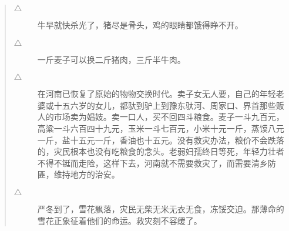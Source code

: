 \begin{quote}
\begin{description}
		\item [$\bigtriangleup$] 牛早就快杀光了，猪尽是骨头，鸡的眼睛都饿得睁不开。\\

		\item [$\bigtriangleup$] 一斤麦子可以换二斤猪肉，三斤半牛肉。\\

		\item [$\bigtriangleup$] 在河南已恢复了原始的物物交换时代。卖子女无人要，自己的年轻老婆或十五六岁的女儿，都驮到驴上到豫东驮河、周家口、界首那些贩人的市场卖为娼妓。卖一口人，买不回四斗粮食。麦子一斗九百元，高粱一斗六百四十九元，玉米一斗七百元，小米十元一斤，蒸馍八元一斤，盐十五元一斤，香油也十五元。没有救灾办法，粮价不会跌落的，灾民根本也没有吃粮食的念头。老弱妇孺终日等死，年轻力壮者不得不铤而走险，这样下去，河南就不需要救灾了，而需要清乡防匪，维持地方的治安。\\

		\item [$\bigtriangleup$] 严冬到了，雪花飘落，灾民无柴无米无衣无食，冻馁交迫。那薄命的雪花正象征着他们的命运。救灾刻不容缓了。\\
	\end{description}
\end{quote}
